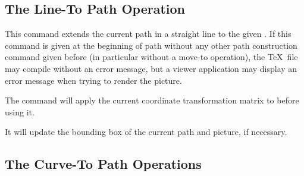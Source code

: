 \subsection{The Line-To Path Operation}

\begin{command}{\pgfpathlineto{}}
  This command extends the current path in a straight line to the
  given . If this command is given at the beginning
  of path without any other path construction command given before (in
  particular without a move-to operation), the \TeX\ file may compile
  without an error message, but a viewer application may display an
  error message when trying to render the picture.
\begin{codeexample}[]
\begin{pgfpicture}
  \pgfpathmoveto{\pgfpointorigin}
  \pgfpathlineto{\pgfpoint{1cm}{1cm}}
  \pgfpathlineto{\pgfpoint{2cm}{1cm}}
\end{pgfpicture}
\end{codeexample}
  The command will apply the current coordinate transformation matrix
  to  before using it.

  It will update the bounding box of the current path and
  picture, if necessary.
\end{command}


\subsection{The Curve-To Path Operations}

